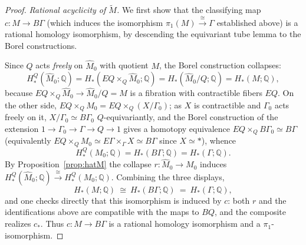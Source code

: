 \documentclass[12pt]{article}
\theoremstyle{definition}
\begin{document}
\begin{proof}
\emph{Rational acyclicity of $\widetilde M$.} We first show that the
classifying map $c\colon M\to B\Gamma$ (which induces the isomorphism
$\pi_1(M)\xrightarrow{\cong}\Gamma$ established above) is a rational homology
isomorphism, by descending the equivariant tube lemma to the Borel
constructions.

Since $Q$ acts \emph{freely} on $\widehat M_0$ with quotient $M$, the Borel
construction collapses:
\[
   H^Q_*(\widehat M_0;\mathbb{Q})
   = H_*(EQ\times_Q\widehat M_0;\mathbb{Q})
   = H_*(\widehat M_0/Q;\mathbb{Q}) = H_*(M;\mathbb{Q}),
\]
because $EQ\times_Q\widehat M_0\to\widehat M_0/Q=M$ is a fibration with
contractible fibers $EQ$. On the other side, $EQ\times_Q M_0=EQ\times_Q(X/\Gamma_0)$;
as $X$ is contractible and $\Gamma_0$ acts freely on it, $X/\Gamma_0\simeq B\Gamma_0$
$Q$-equivariantly, and the Borel construction of the extension
$1\to\Gamma_0\to\Gamma\to Q\to1$ gives a homotopy equivalence
$EQ\times_Q B\Gamma_0\simeq B\Gamma$ (equivalently
$EQ\times_Q M_0\simeq E\Gamma\times_\Gamma X\simeq B\Gamma$ since $X\simeq\ast$),
whence
\[
   H^Q_*(M_0;\mathbb{Q})=H_*(B\Gamma;\mathbb{Q})=H_*(\Gamma;\mathbb{Q}).
\]
By Proposition~\ref{prop:hatM} the collapse $r\colon\widehat M_0\to M_0$ induces
$H^Q_*(\widehat M_0;\mathbb{Q})\xrightarrow{\cong}H^Q_*(M_0;\mathbb{Q})$.
Combining the three displays,
\begin{equation}\label{eq:Mhomology}
   H_*(M;\mathbb{Q})\ \cong\ H_*(B\Gamma;\mathbb{Q})\ =\ H_*(\Gamma;\mathbb{Q}),
\end{equation}
and one checks directly that this isomorphism is induced by $c$: both $r$ and the
identifications above are compatible with the maps to $BQ$, and the composite
realizes $c_*$. Thus $c\colon M\to B\Gamma$ is a rational homology isomorphism
and a $\pi_1$-isomorphism.


\end{proof}
\end{document}
